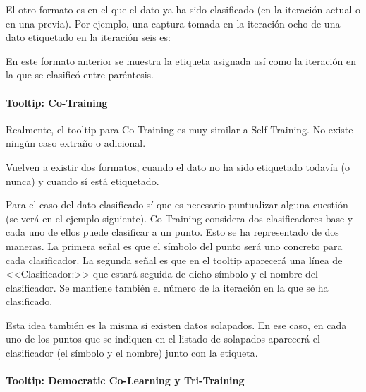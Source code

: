 
El otro formato es en el que el dato ya ha sido clasificado (en la iteración
actual o en una previa). Por ejemplo, una captura tomada en la iteración ocho de
una dato etiquetado en la iteración seis es:


En este formato anterior se muestra la etiqueta asignada así como la iteración
en la que se clasificó entre paréntesis.

\paragraph{Tooltip: Co-Training}

Realmente, el tooltip para Co-Training es muy similar a Self-Training. No existe
ningún caso extraño o adicional.

Vuelven a existir dos formatos, cuando el dato no ha sido etiquetado todavía (o
nunca) y cuando sí está etiquetado. 


Para el caso del dato clasificado sí que es necesario puntualizar alguna
cuestión (se verá en el ejemplo siguiente). Co-Training considera dos
clasificadores base y cada uno de ellos puede clasificar a un punto. Esto se ha
representado de dos maneras. La primera señal es que el símbolo del punto será
uno concreto para cada clasificador. La segunda señal es que en el tooltip
aparecerá una línea de <<Clasificador:>> que estará seguida de dicho símbolo y
el nombre del clasificador. Se mantiene también el número de la iteración en la
que se ha clasificado.


Esta idea también es la misma si existen datos solapados. En ese caso, en cada
uno de los puntos que se indiquen en el listado de solapados aparecerá el
clasificador (el símbolo y el nombre) junto con la etiqueta.


\paragraph{Tooltip: Democratic Co-Learning y Tri-Training}


